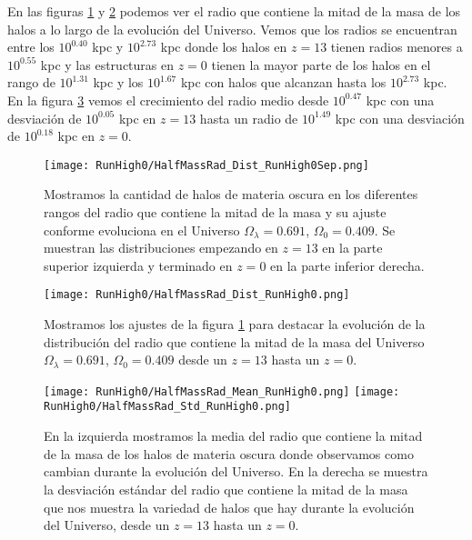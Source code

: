 En las figuras \ref{fig:High0-HalfMassRadDistSep} y \ref{fig:High0-HalfMassRadDist} podemos ver el radio que contiene la mitad de la masa de los halos a lo largo de la evolución del Universo. Vemos que los radios se encuentran entre los $10^{0.40}$ kpc y $10^{2.73}$ kpc donde los halos en $z=13$ tienen radios menores a $10^{0.55}$ kpc y las estructuras en $z=0$ tienen la mayor parte de los halos en el rango de $10^{1.31}$ kpc y los $10^{1.67}$ kpc con halos que alcanzan hasta los $10^{2.73}$ kpc. En la figura \ref{fig:High0-HalfMassRadStats} vemos el crecimiento del radio medio desde $10^{0.47}$ kpc con una desviación de $10^{0.05}$ kpc en $z=13$ hasta un radio de $10^{1.49}$ kpc con una desviación de $10^{0.18}$ kpc en $z=0$.

\begin{figure}[H]
    \centering
    \texttt{[image: RunHigh0/HalfMassRad\_Dist\_RunHigh0Sep.png]}
    \caption[Radio que contiene la mitad de la masa]{\footnotesize Mostramos la cantidad de halos de materia oscura en los diferentes rangos del radio que contiene la mitad de la masa y su ajuste conforme evoluciona en el Universo $\Omega_\lambda = 0.691$, $\Omega_0 = 0.409$. Se muestran las distribuciones empezando en $z=13$ en la parte superior izquierda y terminado en $z=0$ en la parte inferior derecha.}
    \label{fig:High0-HalfMassRadDistSep}
\end{figure}

\begin{figure}[H]
    \centering
    \texttt{[image: RunHigh0/HalfMassRad\_Dist\_RunHigh0.png]}
    \caption[Distribución del radio que contiene la mitad de la masa]{\footnotesize Mostramos los ajustes de la figura \ref{fig:High0-HalfMassRadDistSep} para destacar la evolución de la distribución del radio que contiene la mitad de la masa del Universo $\Omega_\lambda = 0.691$, $\Omega_0 = 0.409$ desde un $z=13$ hasta un $z=0$.}
    \label{fig:High0-HalfMassRadDist}
\end{figure}

\begin{figure}[H]
    \centering
    \texttt{[image: RunHigh0/HalfMassRad\_Mean\_RunHigh0.png]}
    \texttt{[image: RunHigh0/HalfMassRad\_Std\_RunHigh0.png]}
    \caption[Media y desviación estándar del radio de la mitad de la masa]{\footnotesize En la izquierda mostramos la media del radio que contiene la mitad de la masa de los halos de materia oscura donde observamos como cambian durante la evolución del Universo. En la derecha se muestra la desviación estándar del radio que contiene la mitad de la masa que nos muestra la variedad de halos que hay durante la evolución del Universo, desde un $z=13$ hasta un $z=0$.}
    \label{fig:High0-HalfMassRadStats}
\end{figure}

